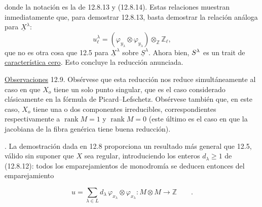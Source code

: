 \noindent
donde la notación es la de 12.8.13 y (12.8.14). Estas relaciones muestran
inmediatamente que, para demostrar 12.8.13, basta demostrar la relación
análoga para $\underline X^\lambda$:
\[
 u_\ell^\lambda=
 (\varphi_{y_\lambda}\otimes\varphi_{y_\lambda})
 \otimes_{\mathbb Z}\mathbb Z_\ell,
\]
que no es otra cosa que 12.5 para $\underline X^\lambda$ sobre
$\underline S^\lambda$. Ahora bien, $\sisi{\underline S}{\underline
S^\lambda}$ es un trait de \underline{característica cero}. Esto concluye
la reducción anunciada.

\medskip
\noindent
\underline{Observaciones} 12.9. Obsérvese que esta reducción nos reduce
simultáneamente al caso en que $X_o$ tiene un solo punto singular, que es
el caso considerado clásicamente en la fórmula de Picard--Lefschetz.
Obsérvese también que, en este caso, $X_o$ tiene una o dos componentes
irreducibles, correspondientes respectivamente a
$\operatorname{rank}M=1$ y $\operatorname{rank}M=0$ (este último es el
caso en que la jacobiana de la fibra genérica tiene buena reducción).


\medskip
{}. La demostración dada en 12.8 proporciona un resultado más general
que 12.5, válido sin suponer que $X$ sea regular, introduciendo los
enteros $d_\lambda\geqslant1$ de (12.8.12): todos los emparejamientos de
monodromía se deducen entonces del emparejamiento

\begin{equation}\tag{12.10.1}
 u=\sum_{\lambda\in L}d_\lambda\,
   \varphi_{x_\lambda}\otimes\varphi_{x_\lambda}:
   M\otimes M\longrightarrow\mathbb Z\qquad .
\end{equation}
